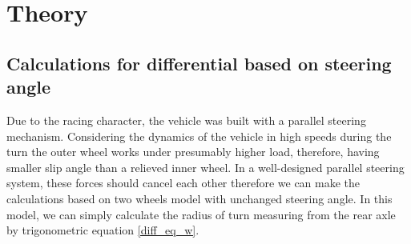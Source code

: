 




\chapter{Theory}

\section{Calculations for differential based on steering angle} \label{diff_calc}

Due to the racing character, the vehicle was built with a parallel steering mechanism. Considering the dynamics of the vehicle in high speeds during the turn the outer wheel works under presumably higher load, therefore, having smaller slip angle than a relieved inner wheel. In a well-designed parallel steering system, these forces should cancel each other therefore we can make the calculations based on two wheels model with unchanged steering angle.\cite{vehicle_dyna}
In this model, we can simply calculate the radius of turn measuring from the rear axle by trigonometric equation \ref{diff_eq_w}.

